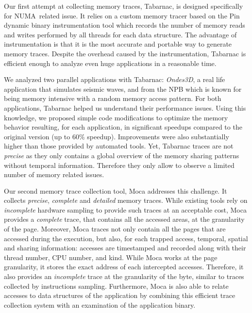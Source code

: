 Our first attempt at collecting memory traces, \gls{Tabarnac}, is designed specifically for \gls{NUMA} related issue.
It relies on a custom memory tracer based on the Pin dynamic binary instrumentation tool which records the number of memory reads and writes performed by all threads for each data structure.
The advantage of instrumentation is that it is the most accurate and portable way to generate memory traces.
Despite the overhead caused by the instrumentation, \gls{Tabarnac} is efficient enough to analyze even huge applications in a reasonable time.

We analyzed two parallel applications with \gls{Tabarnac}: \emph{Ondes3D}, a real life application that
simulates seismic waves, and \IS from the \gls{NPB} which is known for being memory intensive with a random memory access pattern.
For both applications, \gls{Tabarnac} helped us understand their performance issues.
Using this knowledge, we proposed simple code modifications to optimize the memory behavior resulting, for each application, in significant speedups compared to the original version (up to $60\%$ speedup).
Improvements were also substantially higher than those provided by automated tools.
Yet, \gls{Tabarnac} traces are not \emph{precise} as they only contains a global overview of the memory sharing patterns without temporal information.
Therefore they only allow to observe a limited number of memory related issues.

Our second memory trace collection tool, \gls{Moca} addresses this challenge.
It  collects \emph{precise}, \emph{complete} and \emph{detailed} memory traces.
While existing tools rely on \emph{incomplete} hardware sampling to provide such traces at an acceptable cost, \gls{Moca} provides a \emph{complete} trace, that contains all the accessed areas, at the granularity of the page.
Moreover, \gls{Moca} traces not only contain all the pages that are accessed during the execution, but also, for each trapped access, temporal, spatial and sharing information: accesses are timestamped and recorded along with their thread number, CPU number, and kind.
While \gls{Moca} works at the page granularity, it stores the exact address of each intercepted accesses.
Therefore, it also provides an \emph{incomplete} trace at the granularity of the byte, similar to traces collected by instructions sampling.
Furthermore, \gls{Moca} is also able to relate accesses to data structures of the application by combining this efficient trace collection system with an examination of the application binary.

